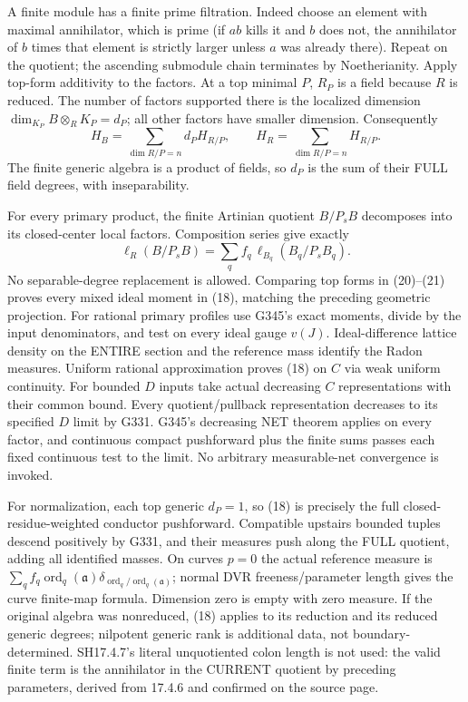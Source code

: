 \documentclass[11pt]{article}
\begin{document}
A finite module has a finite prime filtration. Indeed choose an element with maximal annihilator, which is prime (if $ab$ kills it and $b$ does not, the annihilator of $b$ times that element is strictly larger unless $a$ was already there). Repeat on the quotient; the ascending submodule chain terminates by Noetherianity. Apply top-form additivity to the factors. At a top minimal $P$, $R_P$ is a field because $R$ is reduced. The number of factors supported there is the localized dimension $\dim_{K_P}B\otimes_RK_P=d_P$; all other factors have smaller dimension. Consequently
\[
H_B=\sum_{\dim R/P=n}d_PH_{R/P},\qquad H_R=\sum_{\dim R/P=n}H_{R/P}. \tag{20}
\]
The finite generic algebra is a product of fields, so $d_P$ is the sum of their FULL field degrees, with inseparability.

For every primary product, the finite Artinian quotient $B/P_sB$ decomposes into its closed-center local factors. Composition series give exactly
\[
\ell_R(B/P_sB)=\sum_q f_q\,\ell_{B_q}(B_q/P_sB_q).    \tag{21}
\]
No separable-degree replacement is allowed. Comparing top forms in (20)--(21) proves every mixed ideal moment in (18), matching the preceding geometric projection. For rational primary profiles use G345's exact moments, divide by the input denominators, and test on every ideal gauge $v(J)$. Ideal-difference lattice density on the ENTIRE section and the reference mass identify the Radon measures. Uniform rational approximation proves (18) on $C$ via weak uniform continuity. For bounded $D$ inputs take actual decreasing $C$ representations with their common bound. Every quotient/pullback representation decreases to its specified $D$ limit by G331. G345's decreasing NET theorem applies on every factor, and continuous compact pushforward plus the finite sums passes each fixed continuous test to the limit. No arbitrary measurable-net convergence is invoked.

For normalization, each top generic $d_P=1$, so (18) is precisely the full closed-residue-weighted conductor pushforward. Compatible upstairs bounded tuples descend positively by G331, and their measures push along the FULL quotient, adding all identified masses. On curves $p=0$ the actual reference measure is
$\sum_q f_q\operatorname{ord}_q(\mathfrak a)\delta_{\operatorname{ord}_q/\operatorname{ord}_q(\mathfrak a)}$;
normal DVR freeness/parameter length gives the curve finite-map formula. Dimension zero is empty with zero measure. If the original algebra was nonreduced, (18) applies to its reduction and its reduced generic degrees; nilpotent generic rank is additional data, not boundary-determined. SH17.4.7's literal unquotiented colon length is not used: the valid finite term is the annihilator in the CURRENT quotient by preceding parameters, derived from 17.4.6 and confirmed on the source page.
\end{document}
